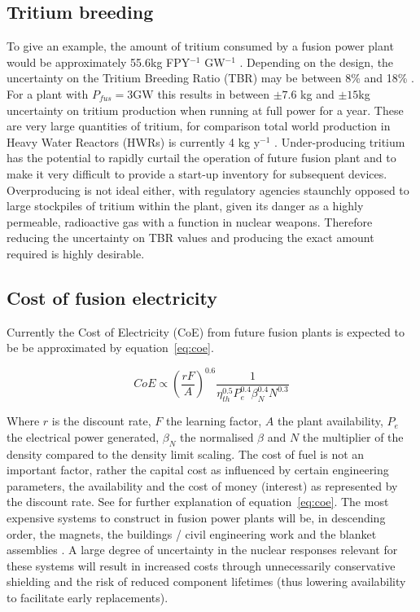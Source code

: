 \subsection{Tritium breeding}
To give an example, the amount of tritium consumed by a fusion power plant would be approximately 55.6kg FPY$^{-1}$ GW$^{-1}$ . Depending on the design, the uncertainty on the Tritium Breeding Ratio (TBR)  may be between 8\% and 18\% \cite{El-Guebaly2009}. For a plant with $P_{fus}=3\mathrm{GW}$  this results in between $\pm7.6$ kg and $\pm15$kg uncertainty on tritium production when running at full power for a year. These are very large quantities of tritium, for comparison total world production in Heavy Water Reactors (HWRs)  is currently 4 kg y$^{-1}$ \cite{Kovari2018}. Under-producing tritium has the potential to rapidly curtail the operation of future fusion plant and to make it very difficult to provide a start-up inventory for subsequent devices. Overproducing is not ideal either, with regulatory agencies staunchly opposed to large stockpiles of tritium within the plant, given its danger as a highly permeable, radioactive gas with a function in nuclear weapons. Therefore reducing the uncertainty on TBR values and producing the exact amount required is highly desirable.

\subsection{Cost of fusion electricity}
Currently the Cost of Electricity (CoE)  from future fusion plants is expected to be be approximated by equation~\ref{eq:coe}. 

\begin{equation}
  \label{eq:coe}
  CoE \propto \left(\frac{rF}{A}\right)^{0.6} \frac{1}{\eta^{0.5}_{th} P^{0.4}_{e} \beta^{0.4}_{N} N^{0.3}}
\end{equation}

Where $r$ is the discount rate, $F$ the learning factor, $A$ the plant availability, $P_{e}$ the electrical power generated, $\beta_{N}$ the normalised $\beta$ and $N$ the multiplier of the density compared to the density limit scaling. The cost of fuel is not an important factor, rather the capital cost as influenced by certain engineering parameters, the availability and the cost of money (interest) as represented by the discount rate. See \cite{Ward2005} for further explanation of equation~\ref{eq:coe}. The most expensive systems to construct in fusion power plants will be, in descending order, the magnets, the buildings / civil engineering work and the blanket assemblies \cite{Entler2018}. A large degree of uncertainty in the nuclear responses relevant for these systems will result in increased costs through unnecessarily conservative shielding and the risk of reduced component lifetimes (thus lowering availability to facilitate early replacements). 

